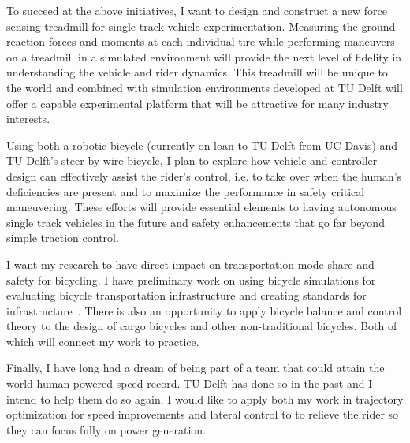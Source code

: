 \documentclass{article}
\begin{document}
To succeed at the above initiatives, I want to design and construct a new force
sensing treadmill for single track vehicle experimentation. Measuring the
ground reaction forces and moments at each individual tire while performing
maneuvers on a treadmill in a simulated environment will provide the next level
of fidelity in understanding the vehicle and rider dynamics. This treadmill
will be unique to the world and combined with simulation environments developed
at TU Delft will offer a capable experimental platform that will be attractive
for many industry interests.

Using both a robotic bicycle (currently on loan to TU Delft from UC Davis) and
TU Delft's steer-by-wire bicycle, I plan to explore how vehicle and controller
design can effectively assist the rider's control, i.e. to take over when the
human's deficiencies are present and to maximize the performance in safety
critical maneuvering. These efforts will provide essential elements to having
autonomous single track vehicles in the future and safety enhancements that go
far beyond simple traction control.

I want my research to have direct impact on transportation mode share and
safety for bicycling. I have preliminary work on using bicycle simulations for
evaluating bicycle transportation infrastructure and creating standards for
infrastructure~\cite{Buehler2012}. There is also an opportunity to apply
bicycle balance and control theory to the design of cargo bicycles and other
non-traditional bicycles. Both of which will connect my work to practice.

Finally, I have long had a dream of being part of a team that could attain the
world human powered speed record. TU Delft has done so in the past and I intend
to help them do so again. I would like to apply both my work in trajectory
optimization for speed improvements and lateral control to to relieve the rider
so they can focus fully on power generation.



\end{document}
